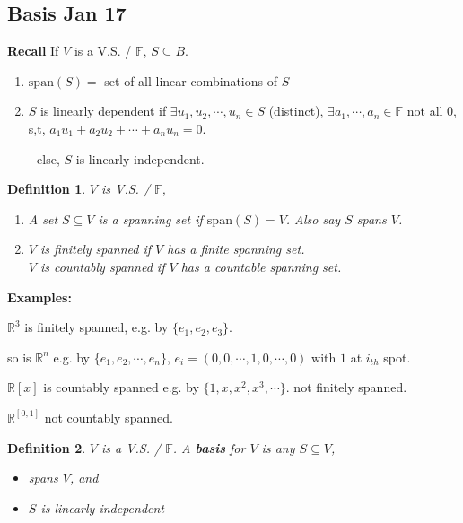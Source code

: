 \documentclass[12pt]{article}
\newtheorem{definition}{Definition}[subsection]
\newcommand{\Span}{\mathrm{span}}
\newcommand{\mR}{{\mathbb{R}}}
\newcommand{\mF}{{\mathbb{F}}}
\begin{document}
	\subsection{Basis Jan 17}

	\textbf{Recall} If $V$ is a V.S. / $\mF$, $S \subseteq B$. 
	\begin{enumerate}
		\item $\Span(S) = $ set of all linear combinations of $S$
		\item $S$ is linearly dependent if $\exists u_1, u_2,\cdots, u_n \in S$
			(distinct), $\exists a_1, \cdots, a_n \in \mF$ not all $0$, 
			s,t, $a_1u_1+a_2u_2+\cdots+a_nu_n = 0$. 

			- else, $S$ is linearly independent. \\
	\end{enumerate}
	
	\begin{definition}
		$V$ is V.S. / $\mF$, 
		\begin{enumerate}
			\item A set $S\subseteq V$ is a spanning set if $\Span(S) = V$. 
				Also say $S$ spans $V$. 
			\item $V$ is finitely spanned if $V$ has a finite spanning set.\\
				$V$ is countably spanned if $V$ has a countable spanning set.\\	
		\end{enumerate}
	\end{definition}

	{\color{Brown}
		\textbf{Examples: }
		
		$\mR^3$ is finitely spanned, e.g. by $\{e_1, e_2, e_3\}$. 

		so is $\mR^n$ e.g. by $\{e_1, e_2, \cdots, e_n\}$,
		$e_i = (0, 0, \cdots, 1, 0,\cdots, 0)$ with $1$ at $i_{th}$ spot.

		$\mathbb{R}[x]$ is countably spanned e.g. by $\{1,x,x^2,x^3,\cdots\}$.
		not finitely spanned. 

		$\mathbb{R}^[0,1]$ not countably spanned. \\
	}

	\begin{definition}
		$V$ is a V.S. / $\mF$.
		A \textbf{basis} for $V$ is any $S\subseteq V$, 
		\begin{itemize}
			\item spans $V$, and 
			\item $S$ is linearly independent \\
		\end{itemize}
	\end{definition}
	
\end{document}
